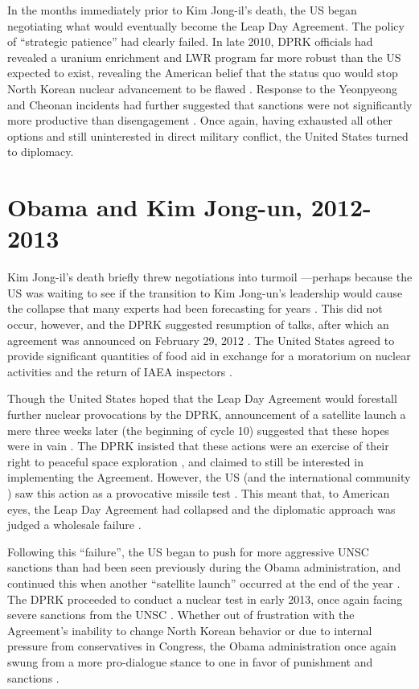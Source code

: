 In the months immediately prior to Kim Jong-il's death, the US began negotiating what would eventually become the Leap Day Agreement. The policy of ``strategic patience'' had clearly failed. In late 2010, DPRK officials had revealed a uranium enrichment and LWR program far more robust than the US expected to exist, revealing the American belief that the status quo would stop North Korean nuclear advancement to be flawed \cite{snyder2}. Response to the Yeonpyeong and Cheonan incidents had further suggested that sanctions were not significantly more productive than disengagement \cite{delury}. Once again, having exhausted all other options and still uninterested in direct military conflict, the United States turned to diplomacy.

\section{Obama and Kim Jong-un, 2012-2013}

Kim Jong-il's death briefly threw negotiations into turmoil \cite{crs13}---perhaps because the US was waiting to see if the transition to Kim Jong-un's leadership would cause the collapse that many experts had been forecasting for years \cite{delury}. This did not occur, however, and the DPRK suggested resumption of talks, after which an agreement was announced on February 29, 2012 \cite{delury}. The United States agreed to provide significant quantities of food aid in exchange for a moratorium on nuclear activities and the return of IAEA inspectors \cite{crs13}.

Though the United States hoped that the Leap Day Agreement would forestall further nuclear provocations by the DPRK, announcement of a satellite launch a mere three weeks later (the beginning of cycle 10) suggested that these hopes were in vain \cite{snyder2}. The DPRK insisted that these actions were an exercise of their right to peaceful space exploration \cite{crs13}, and claimed to still be interested in implementing the Agreement. However, the US (and the international community \cite{unsc13}) saw this action as a provocative missile test \cite{davenport}. This meant that, to American eyes, the Leap Day Agreement had collapsed and the diplomatic approach was judged a wholesale failure \cite{delury}.

Following this ``failure'', the US began to push for more aggressive UNSC sanctions than had been seen previously during the Obama administration, and continued this when another ``satellite launch'' occurred at the end of the year \cite{crs13}. The DPRK proceeded to conduct a nuclear test in early 2013, once again facing severe sanctions from the UNSC \cite{davenport}. Whether out of frustration with the Agreement's inability to change North Korean behavior or due to internal pressure from conservatives in Congress, the Obama administration once again swung from a more pro-dialogue stance to one in favor of punishment and sanctions \cite{snyder2}.